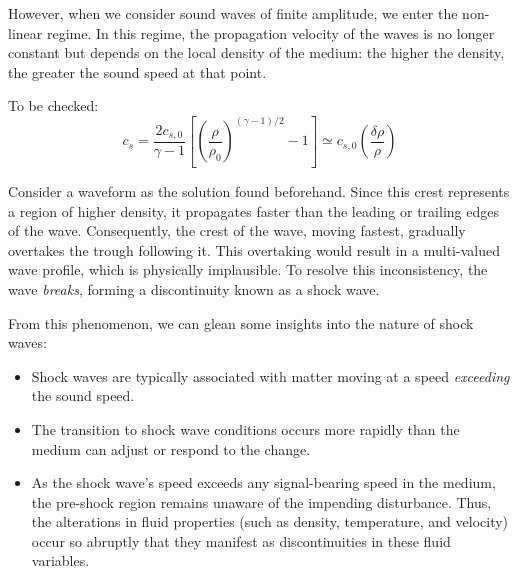 However, when we consider sound waves of finite amplitude, we enter the non-linear regime. In this regime, the propagation velocity of the waves is no longer constant but depends on the local density of the medium: the higher the density, the greater the sound speed at that point.


To be checked: \[ c_s = \frac{2 c_{s,0}}{\gamma - 1} \left[ \left( \frac{\rho}{\rho_0} \right)^{(\gamma-1)/2} -1 \right] \simeq c_{s,0} \left( \frac{\delta \rho}{\rho} \right) \]

Consider a waveform as the solution found beforehand. Since this crest represents a region of higher density, it propagates faster than the leading or trailing edges of the wave. Consequently, the crest of the wave, moving fastest, gradually overtakes the trough following it. This overtaking would result in a multi-valued wave profile, which is physically implausible. To resolve this inconsistency, the wave \emph{breaks}, forming a discontinuity known as a shock wave.


From this phenomenon, we can glean some insights into the nature of shock waves:
%
\begin{itemize}
\item Shock waves are typically associated with matter moving at a speed \emph{exceeding} the sound speed.
\item The transition to shock wave conditions occurs more rapidly than the medium can adjust or respond to the change.
\item As the shock wave's speed exceeds any signal-bearing speed in the medium, the pre-shock region remains unaware of the impending disturbance. Thus, the alterations in fluid properties (such as density, temperature, and velocity) occur so abruptly that they manifest as discontinuities in these fluid variables.
\end{itemize}

%


